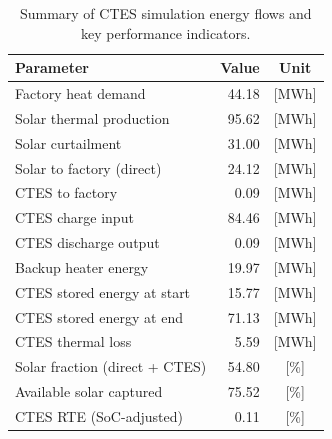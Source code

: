 \renewcommand{\arraystretch}{1.2}
\begin{table}[h]
\centering
\begin{tabular}{l|r c}
\hline
Parameter & Value & Unit \\
\hline
Factory heat demand & 44.18 & [MWh] \\
Solar thermal production & 95.62 & [MWh] \\
Solar curtailment & 31.00 & [MWh] \\
Solar to factory (direct) & 24.12 & [MWh] \\
CTES to factory & 0.09 & [MWh] \\
CTES charge input & 84.46 & [MWh] \\
CTES discharge output & 0.09 & [MWh] \\
Backup heater energy & 19.97 & [MWh] \\
CTES stored energy at start & 15.77 & [MWh] \\
CTES stored energy at end & 71.13 & [MWh] \\
CTES thermal loss & 5.59 & [MWh] \\
\hline
Solar fraction (direct + CTES) & 54.80 & [\%] \\
Available solar captured & 75.52 & [\%] \\
CTES RTE (SoC-adjusted) & 0.11 & [\%] \\
\hline
\end{tabular}
\caption{Summary of CTES simulation energy flows and key performance indicators.}
\label{tab:ctes-simulation-summary}
\end{table}
